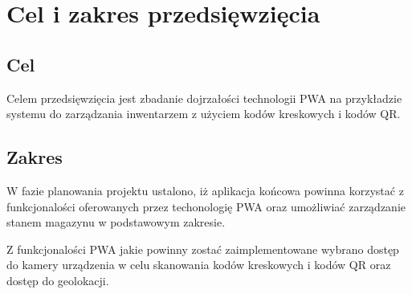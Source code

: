 \documentclass[../main.tex]{subfiles}
\begin{document}
\section{Cel i zakres przedsięwzięcia}
    \subsection{Cel}    
        Celem przedsięwzięcia jest zbadanie dojrzałości technologii PWA na przykładzie systemu do zarządzania inwentarzem z użyciem kodów kreskowych i kodów QR.

        

    \subsection{Zakres}
        W fazie planowania projektu ustalono, iż aplikacja końcowa powinna korzystać z funkcjonalości oferowanych przez techonologię PWA oraz umożliwiać zarządzanie stanem magazynu w podstawowym zakresie. 

        Z funkcjonalości PWA jakie powinny zostać zaimplementowane wybrano dostęp do kamery urządzenia w celu skanowania kodów kreskowych i kodów QR oraz dostęp do geolokacji.
\end{document}
